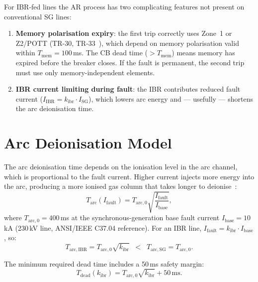 \documentclass[11pt,a4paper]{article}
\begin{document}
For IBR-fed lines the AR process has two complicating features not present on
conventional SG lines:
\begin{enumerate}
  \item \textbf{Memory polarisation expiry}: the first trip correctly uses Zone~1
    or Z2/POTT (TR-30, TR-33~\cite{SAMBP_TR30,SAMBP_TR33}), which depend on
    memory polarisation valid within $T_\mathrm{mem}=100$\,ms.  The CB dead
    time ($>T_\mathrm{mem}$) means memory has expired before the breaker closes.
    If the fault is permanent, the second trip must use only memory-independent
    elements.

  \item \textbf{IBR current limiting during fault}: the IBR contributes reduced
    fault current ($I_\mathrm{IBR}=k_\mathrm{ibr}\cdot I_\mathrm{SG}$), which
    lowers arc energy and --- usefully --- shortens the arc deionisation time.
\end{enumerate}

\section{Arc Deionisation Model}
\label{sec:arcmodel}

The arc deionisation time depends on the ionisation level in the arc channel,
which is proportional to the fault current.  Higher current injects more energy
into the arc, producing a more ionised gas column that takes longer to
deionise~\cite{Blackburn2006}:
\begin{equation}
  T_\mathrm{arc}(I_\mathrm{fault}) = T_\mathrm{arc,0}
  \sqrt{\frac{I_\mathrm{fault}}{I_\mathrm{base}}},
  \label{eq:t_arc}
\end{equation}
where $T_\mathrm{arc,0}=400$\,ms at the synchronous-generation base fault current
$I_\mathrm{base}=10$\,kA (230\,kV line, ANSI/IEEE C37.04 reference).  For an
IBR line, $I_\mathrm{fault}=k_\mathrm{ibr}\cdot I_\mathrm{base}$, so:
\begin{equation}
  T_\mathrm{arc,IBR} = T_\mathrm{arc,0}\sqrt{k_\mathrm{ibr}}
  \;\;<\;\; T_\mathrm{arc,SG} = T_\mathrm{arc,0}.
  \label{eq:t_arc_ibr}
\end{equation}

The minimum required dead time includes a 50\,ms safety margin:
\begin{equation}
  T_\mathrm{dead}(k_\mathrm{ibr})
  = T_\mathrm{arc,0}\sqrt{k_\mathrm{ibr}} + 50\,\text{ms}.
  \label{eq:t_dead}
\end{equation}
\end{document}
